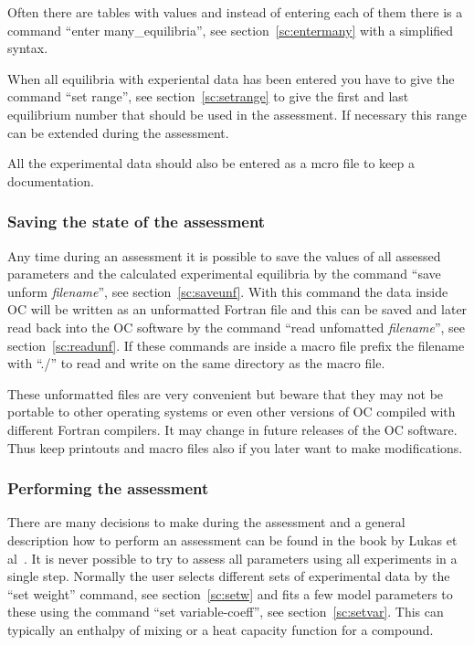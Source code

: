 \documentclass[11pt]{article}
\begin{document}
Often there are tables with values and instead of entering each of
them there is a command ``enter many\_equilibria'', see
section~\ref{sc:entermany} with a simplified syntax.

When all equilibria with experiental data has been entered you have to
give the command ``set range'', see section~\ref{sc:setrange} to give
the first and last equilibrium number that should be used in the
assessment.  If necessary this range can be extended during the
assessment.

All the experimental data should also be entered as a mcro file to
keep a documentation.

\subsubsection{Saving the state of the assessment}

Any time during an assessment it is possible to save the values of all
assessed parameters and the calculated experimental equilibria by the
command ``save unform {\em filename}'', see section~\ref{sc:saveunf}.
With this command the data inside OC will be written as an unformatted
Fortran file and this can be saved and later read back into the OC
software by the command ``read unfomatted {\em filename}'', see
section~\ref{sc:readunf}.  If these commands are inside a macro file
prefix the filename with ``./'' to read and write on the same
directory as the macro file.

These unformatted files are very convenient but beware that they may
not be portable to other operating systems or even other versions of
OC compiled with different Fortran compilers.  It may change in future
releases of the OC software.  Thus keep printouts and macro files also
if you later want to make modifications.

\subsubsection{Performing the assessment}\label{sc:assess}

There are many decisions to make during the assessment and a general
description how to perform an assessment can be found in the book by
Lukas et al~\cite{07Luk}.  It is never possible to try to assess all
parameters using all experiments in a single step.  Normally the user
selects different sets of experimental data by the ``set weight''
command, see section~\ref{sc:setw} and fits a few model parameters to
these using the command ``set variable-coeff'', see
section~\ref{sc:setvar}.  This can typically an enthalpy of mixing or
a heat capacity function for a compound.
\end{document}
